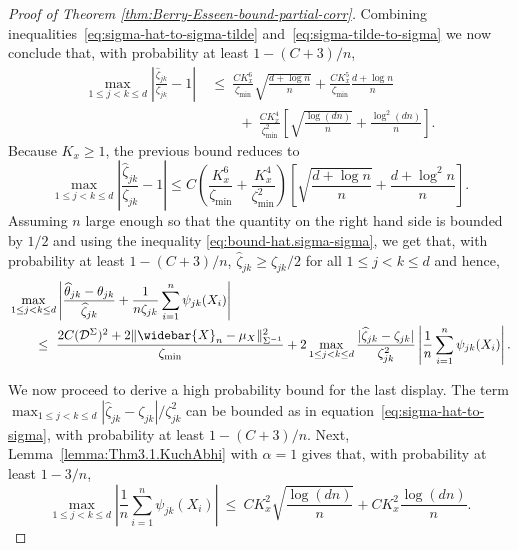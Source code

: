 \documentclass[11pt]{article}
\begin{document}
\begin{appendices}
\begin{proof}[Proof of Theorem \ref{thm:Berry-Esseen-bound-partial-corr}]
Combining inequalities~\eqref{eq:sigma-hat-to-sigma-tilde} and~\eqref{eq:sigma-tilde-to-sigma} we now conclude that, with probability at least $1 - (C+3)/n$,
\begin{align*}
\max_{1\le j < k\le d}\left|\frac{\widehat{\zeta}_{jk}}{\zeta_{jk}} - 1\right| ~&\le~ \frac{CK_x^6}{\zeta_{\min}}\sqrt{\frac{d + \log n}{n}} + \frac{CK_x^5}{\zeta_{\min}}\frac{d + \log n}{n}\\
~&\qquad+~ \frac{CK_x^4}{\zeta_{\min}^2}\left[\sqrt{\frac{\log(dn)}{n}} + \frac{\log^2(dn)}{n}\right].
\end{align*}
Because $K_x \ge 1$, the previous bound reduces to
\begin{equation}\label{eq:sigma-hat-to-sigma}
\max_{1\le j < k\le d}\left|\frac{\widehat{\zeta}_{jk}}{\zeta_{jk}} - 1\right|  \leq C\left(\frac{K_x^6}{\zeta_{\min}} + \frac{K_x^4}{\zeta_{\min}^2}\right)\left[\sqrt{\frac{d + \log n}{n}} + \frac{d + \log^2n}{n}\right]. 
\end{equation}
 Assuming $n$ large enough so that the quantity on the right hand side is bounded by $1/2$ and using the inequality \eqref{eq:bound-hat.sigma-sigma}, we get that, with probability at least $1 - (C + 3)/n$, $\widehat{\zeta}_{jk} \ge \zeta_{jk}/2$ for all $1\le j < k\le d$ and hence,
\begin{align*}
&\max_{1\le j < k\le d}\left|\frac{\widehat{\theta}_{jk} - \theta_{jk}}{\widehat{\zeta}_{jk}} + \frac{1}{n\zeta_{jk}}\sum_{i=1}^n \psi_{jk}(X_i)\right|\\ 
&\qquad\le~ \frac{2C(\mathcal{D}^{\Sigma})^2 + 2\|\widebar{X}_n - \mu_X\|_{\Sigma^{-1}}^2}{\zeta_{\min}}
+ 2\max_{1\le j < k\le d}\frac{|\widehat{\zeta}_{jk} - \zeta_{jk}|}{\zeta_{jk}^2}\left|\frac{1}{n}\sum_{i=1}^n \psi_{jk}(X_i)\right|. 
\end{align*}


We now proceed to derive a high probability bound for the last display. The term $\max_{1\le j < k\le d}{|\widehat{\zeta}_{jk} - \zeta_{jk}|}/{\zeta_{jk}^2}$ can be bounded as in equation~\eqref{eq:sigma-hat-to-sigma}, with probability at least  $1 - (C+3)/n$. Next, Lemma~\ref{lemma:Thm3.1.KuchAbhi} with $\alpha=1$ gives that, with probability at least $1 - 3/n$,
\begin{equation}\label{eq:bound-on-sum-psi}
\max_{1\le j < k\le d}\left|\frac{1}{n}\sum_{i=1}^n \psi_{jk}(X_i)\right| ~\le~ CK_x^2\sqrt{\frac{\log(dn)}{n}} + CK_x^2\frac{\log(dn)}{n}.
\end{equation}





\end{proof}
\end{appendices}
\end{document}
